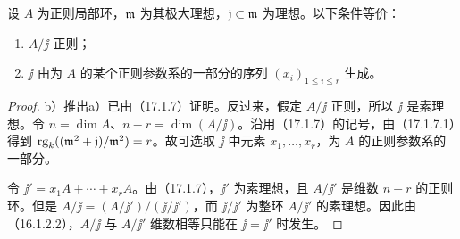 设 $A$ 为正则局部环，$\mathfrak m$ 为其极大理想，$\mathfrak j\subset\mathfrak m$ 为理想。以下条件等价：
\begin{enumerate}[label=\alph*)]
 \item $A/\jj$ 正则；
 \item $\jj$ 由为 $A$ 的某个正则参数系的一部分的序列 $(x_i)_{1\leq i\leq r}$ 生成。
\end{enumerate}
\begin{proof}
b）推出a）已由（17.1.7）证明。反过来，假定 $A/\jj$ 正则，所以 $\jj$ 是素理想。令 $n=\dim A$、$n-r=\dim(A/\jj)$。沿用（17.1.7）的记号，由（17.1.7.1）得到
$\operatorname{rg}_k((\mathfrak m^2+\mathfrak j)/\mathfrak m^2)=r$。故可选取 $\jj$ 中元素 $x_1,\ldots,x_r$，为 $A$ 的正则参数系的一部分。

令 $\jj'=x_1A+\cdots+x_rA$。由（17.1.7），$\jj'$ 为素理想，且 $A/\jj'$ 是维数 $n-r$ 的正则环。但是
$A/\jj=(A/\jj')/(\jj/\jj')$，而 $\jj/\jj'$ 为整环 $A/\jj'$ 的素理想。因此由（16.1.2.2），$A/\jj$ 与 $A/\jj'$ 维数相等只能在 $\jj=\jj'$ 时发生。
\end{proof}
